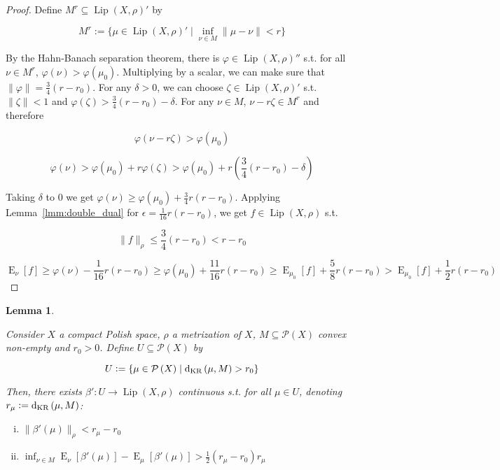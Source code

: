 \documentclass[11pt]{article}
\theoremstyle{definition}
\theoremstyle{plain}
\newtheorem{lemma}{Lemma}%
\newcommand{\N}[1]{\lVert #1 \rVert}
\DeclareMathOperator{\E}{E}
\newcommand{\PM}{\mathcal{P}}
\newcommand{\Lp}{{\operatorname{Lip}}}
\newcommand{\DKR}{\operatorname{d}_{\textnormal{KR}}}
\begin{document}
\begin{proof}

Define $M^r \subseteq \Lp\left(X,\rho\right)'$ by

$$M^r:=\{\mu \in \Lp\left(X,\rho\right)' \mid \inf_{\nu \in M} \N{\mu - \nu} < r\}$$

By the Hahn-Banach separation theorem, there is $\varphi \in \Lp\left(X,\rho\right)''$ s.t. for all $\nu \in M^r$, $\varphi\left(\nu\right) > \varphi\left(\mu_0\right)$. Multiplying by a scalar, we can make sure that $\N{\varphi} = \frac{3}{4}\left(r - r_0\right)$. For any $\delta > 0$, we can choose $\zeta \in \Lp\left(X,\rho\right)'$ s.t. $\N{\zeta} < 1$ and $\varphi\left(\zeta\right) > \frac{3}{4}\left(r-r_0\right) - \delta$.  For any $\nu \in M$, $\nu - r \zeta \in M^r$ and therefore

$$\varphi\left(\nu - r \zeta\right) > \varphi\left(\mu_0\right)$$

$$\varphi\left(\nu\right) > \varphi\left(\mu_0\right) + r \varphi\left(\zeta\right) > \varphi\left(\mu_0\right) + r \left(\frac{3}{4}\left(r-r_0\right) - \delta\right)$$

Taking $\delta$ to 0 we get $\varphi\left(\nu\right) \geq \varphi\left(\mu_0\right) + \frac{3}{4} r \left(r - r_0\right)$. Applying Lemma~\ref{lmm:double_dual} for $\epsilon = \frac{1}{16} r \left(r - r_0\right)$, we get $f \in \Lp\left(X,\rho\right)$ s.t.

$$\N{f}_\rho \leq \frac{3}{4} \left(r - r_0\right) < r - r_0$$ 

$$\E_\nu[f] \geq \varphi\left(\nu\right) - \frac{1}{16} r \left(r - r_0\right) \geq \varphi\left(\mu_0\right) + \frac{11}{16} r \left(r - r_0\right) \geq \E_{\mu_0}[f] +  \frac{5}{8} r \left(r - r_0\right) > \E_{\mu_0}[f] +  \frac{1}{2} r \left(r - r_0\right)$$
\end{proof}

\begin{samepage}
\begin{lemma}
\label{lmm:savvy_outside}

Consider $X$ a compact Polish space, $\rho$ a metrization of $X$, $M \subseteq \PM\left(X\right)$ convex non-empty and $r_0 > 0$. Define $U \subseteq \PM\left(X\right)$ by

\begin{equation*}
U := \{\mu \in \PM\left(X\right) \mid \DKR\left(\mu,M\right) > r_0\}
\end{equation*}

Then, there exists $\beta': U \rightarrow \Lp\left(X,\rho\right)$ continuous s.t. for all $\mu \in U$, denoting $r_\mu:=\DKR\left(\mu,M\right)$:

\begin{enumerate}[i.]

\item $\N{\beta'\left(\mu\right)}_\rho < r_\mu - r_0$
\item $\inf_{\nu \in M} \E_\nu[\beta'\left(\mu\right)] - \E_\mu[\beta'\left(\mu\right)] > \frac{1}{2} \left(r_\mu - r_0\right) r_\mu$

\end{enumerate}

\end{lemma}
\end{samepage}
\end{document}
